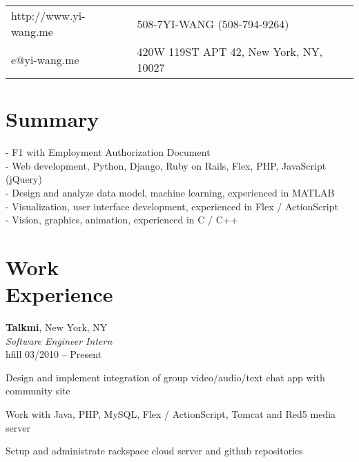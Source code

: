 \documentclass[margin,line]{resume}
\begin{document}
\begin{resume}

      \begin{tabular}{@{}p{6cm}p{8.5cm}}
      http://www.yi-wang.me  &  508-7YI-WANG (508-794-9264)           \\
      e@yi-wang.me             &  420W 119ST APT 42, New York, NY, 10027 \\
      \end{tabular}

 
    \section{\mysidestyle Summary}
      
      - F1 with Employment Authorization Document \\
      - Web development, Python, Django, Ruby on Rails, Flex, PHP, JavaScript (jQuery) \\
      - Design and analyze data model, machine learning, experienced in MATLAB \\
      - Visualization, user interface development, experienced in Flex / ActionScript \\
      - Vision, graphics, animation, experienced in C / C++
      

    \section{\mysidestyle Work \\ Experience}

    \textbf{Talkmi}, New York, NY \\
    \textsl{Software Engineer Intern} \\hfill 03/2010 -- Present \vspace{-3mm}\\\vspace{-1mm}%
      \begin{list2}
      \item Design and implement integration of group video/audio/text chat app with community site
      \item Work with Java, PHP, MySQL, Flex / ActionScript, Tomcat and Red5 media server
      \item Setup and administrate rackspace cloud server and github repositories
      \end{list2}


\end{resume}
\end{document}
